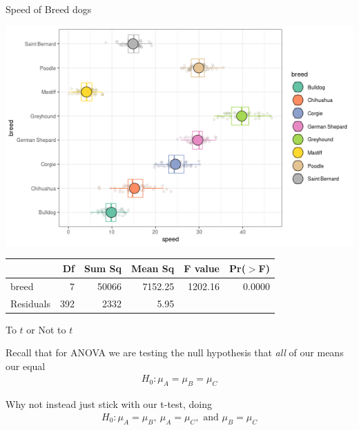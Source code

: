 \documentclass{beamer}
\begin{document}
\begin{frame}{Speed of Breed dogs}
\small
\begin{center}
\includegraphics[scale=0.45]{breed_dog_speed_mean.png}
\end{center}
\begin{table}[ht]
\centering
\begin{tabular}{lrrrrr}
  \hline
 & Df & Sum Sq & Mean Sq & F value & Pr($>$F) \\ 
  \hline
breed       & 7 & 50066 & 7152.25 & 1202.16 & 0.0000 \\ 
  Residuals   & 392 & 2332 & 5.95 &  &  \\ 
   \hline
\end{tabular}
\end{table}
\end{frame}


\begin{frame}{To $t$ or Not to $t$}

Recall that for ANOVA we are testing the null hypothesis that \textit{all} of our means our equal
\begin{align*}
H_0: \mu_A = \mu_B = \mu_C
\end{align*}
\vspace{2mm}

Why not instead just stick with our t-test, doing
\begin{align*}
H_0: \mu_A = \mu_B, \ \mu_A = \mu_C, \text{ and } \mu_B = \mu_C
\end{align*}

\end{frame}
\end{document}
